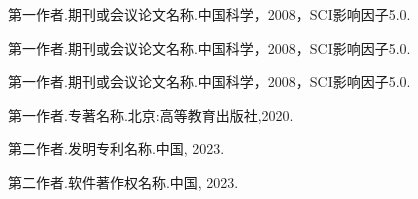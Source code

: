 \begin{resume}
  \begin{enumerate}[label={[\arabic*]},itemsep=0pt,parsep=0pt,labelindent=26pt,labelwidth=*,leftmargin=0pt,itemindent=*,align=left]

\item 第一作者.期刊或会议论文名称.中国科学，2008，SCI影响因子5.0.
\item 第一作者.期刊或会议论文名称.中国科学，2008，SCI影响因子5.0.
\item 第一作者.期刊或会议论文名称.中国科学，2008，SCI影响因子5.0.
\item 第一作者.专著名称.北京:高等教育出版社,2020.
\item 第二作者.发明专利名称.中国, 2023.
\item 第二作者.软件著作权名称.中国, 2023.

  \end{enumerate}

\end{resume}
